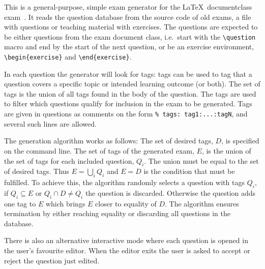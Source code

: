 This is a general-purpose, simple exam generator for the \LaTeX\ documentclass 
exam~\cite{exam}.
It reads the question database from the source code of old exams, a file with 
questions or teaching material with exercises.
The questions are expected to be either questions from the exam document class, 
i.e.\ start with the
\verb'\question'
macro and end by the start of the next question, or be an exercise environment,
\verb'\begin{exercise}'
and
\verb'\end{exercise}'.

In each question the generator will look for tags:
tags can be used to tag that a question covers a specific topic or intended 
learning outcome (or both).
The set of tags is the union of all tags found in the body of the question.
The tags are used to filter which questions qualify for inclusion in the exam 
to be generated.
Tags are given in questions as comments on the form
\verb'% tags: tag1:...:tagN',
and several such lines are allowed.

The generation algorithm works as follows:
The set of desired tags, \(D\), is specified on the command line.
The set of tags of the generated exam, \(E\), is the union of the set of tags 
for each included question, \(Q_i\).
The union must be equal to the set of desired tags.
Thus \(E = \bigcup_i Q_i\) and \(E = D\) is the condition that must be 
fulfilled.
To achieve this, the algorithm randomly selects a question with tags \(Q_i\), 
if \(Q_i\subseteq E\) or \(Q_i\cap D\neq Q_i\) the question is discarded.
Otherwise the question adds one tag to \(E\) which brings \(E\) closer to 
equality of \(D\).
The algorithm ensures termination by either reaching equality or discarding all
questions in the database.

There is also an alternative interactive mode where each question is opened in 
the user's favourite editor.
When the editor exits the user is asked to accept or reject the question just 
edited.
